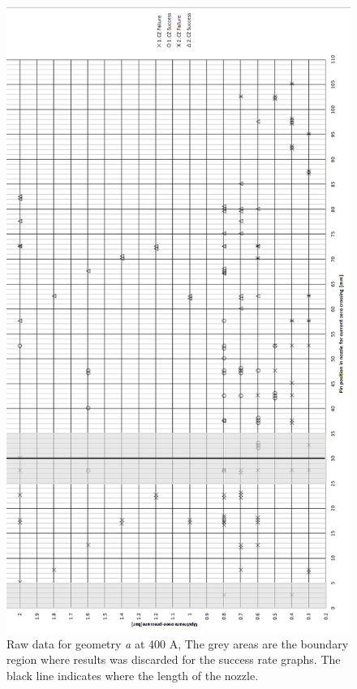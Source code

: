 \documentclass[10pt,a4paper,twoside]{article}
\begin{document}
\begin{figure}[H]
\centering
\includegraphics[scale=0.55]{Bilder/Results/rawData400AgeoA.png}
\caption{Raw data for geometry \textit{a} at 400 A, The grey areas are the boundary region where results was discarded for the success rate graphs. The black line indicates where the length of the nozzle.} \label{fig:rawData400AgeoA}
\end{figure}
\newpage
\end{document}
